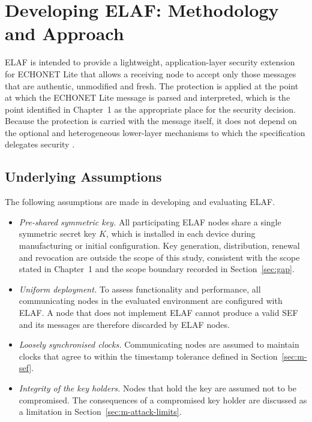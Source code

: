 \section{Developing ELAF: Methodology and Approach}
\label{sec:m-approach}

ELAF is intended to provide a lightweight, application-layer security extension for ECHONET Lite that allows a receiving node to accept only those messages that are authentic, unmodified and fresh. The protection is applied at the point at which the ECHONET Lite message is parsed and interpreted, which is the point identified in Chapter~1 as the appropriate place for the security decision. Because the protection is carried with the message itself, it does not depend on the optional and heterogeneous lower-layer mechanisms to which the specification delegates security \citep{ECHONETPart2,ECHONETGuidelines}.

\subsection{Underlying Assumptions}
\label{sec:m-assumptions}

The following assumptions are made in developing and evaluating ELAF.

\begin{itemize}
  \item \emph{Pre-shared symmetric key.} All participating ELAF nodes share a single symmetric secret key $K$, which is installed in each device during manufacturing or initial configuration. Key generation, distribution, renewal and revocation are outside the scope of this study, consistent with the scope stated in Chapter~1 and the scope boundary recorded in Section~\ref{sec:gap}.
  \item \emph{Uniform deployment.} To assess functionality and performance, all communicating nodes in the evaluated environment are configured with ELAF. A node that does not implement ELAF cannot produce a valid SEF and its messages are therefore discarded by ELAF nodes.
  \item \emph{Loosely synchronised clocks.} Communicating nodes are assumed to maintain clocks that agree to within the timestamp tolerance defined in Section~\ref{sec:m-sef}.
  \item \emph{Integrity of the key holders.} Nodes that hold the key are assumed not to be compromised. The consequences of a compromised key holder are discussed as a limitation in Section~\ref{sec:m-attack-limits}.
\end{itemize}

